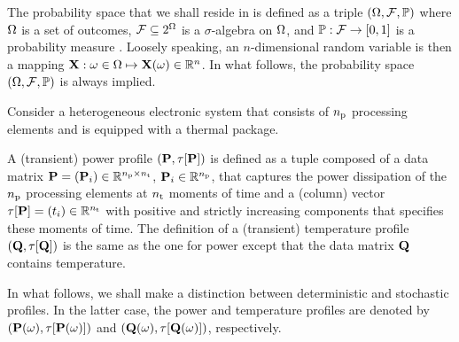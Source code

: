 
The probability space that we shall reside in is defined as a triple $(\Omega, \mathcal{F}, \mathbb{P})$ where $\Omega$ is a set of outcomes, $\mathcal{F} \subseteq 2^\Omega$ is a $\sigma$-algebra on $\Omega$, and $\mathbb{P}: \mathcal{F} \to [0, 1]$ is a probability measure \cite{maitre2010}.
Loosely speaking, an $n$-dimensional random variable is then a mapping $\mathbf{X}: \omega \in \Omega \mapsto \mathbf{X}(\omega) \in \mathbb{R}^n$.
In what follows, the probability space $(\Omega, \mathcal{F}, \mathbb{P})$ is always implied.

Consider a heterogeneous electronic system that consists of ${n_\text{p}}$ processing elements and is equipped with a thermal package.

A (transient) power profile $\profileP$ is defined as a tuple composed of a data matrix $\mP = (\vP_i) \in \real^{\nprocs \times \nsteps}$, $\mathbf{P}_i \in \mathbb{R}^{n_\text{p}}$, that captures the power dissipation of the ${n_\text{p}}$ processing elements at ${n_\text{t}}$ moments of time and a (column) vector $\partition{\mP} = (\t_i) \in \real^{\nsteps}$ with positive and strictly increasing components that specifies these moments of time.
The definition of a (transient) temperature profile $\profileT$ is the same as the one for power except that the data matrix $\mTO$ contains temperature.

In what follows, we shall make a distinction between deterministic and stochastic profiles.
In the latter case, the power and temperature profiles are denoted by $\profileP{\o}$ and $\profileT{\o}$, respectively.

